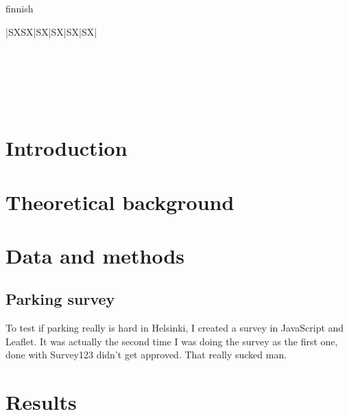 \documentclass[a4paper,11pt]{article}
\newcommand\Tstrut{\rule{0pt}{2.2ex}}       %
\newcommand\Bstrut{\rule[-4.0ex]{0pt}{0pt}} %
\newcommand{\TBstrut}{\Tstrut\Bstrut}       %
\begin{document}
\begin{spacing}{1}
\begin{otherlanguage*}{finnish}
\begin{tabularx}{\linewidth}{|S{X}S{X}|S{X}|S{X}|S{X}|S{X}|}
     \TBstrut\\
    \hline
     \TBstrut\\
    \hline
     \TBstrut\\
    \Xhline{3\arrayrulewidth}
\end{tabularx}
\end{otherlanguage*}
\end{spacing}

\newpage
{}
\thispagestyle{empty}
\renewcommand*\contentsname{Table of contents} %
\tableofcontents

\newpage
\setcounter{page}{1} %
\section{Introduction}

\newpage
\section{Theoretical background}

\newpage
\section{Data and methods}
\subsection{Parking survey}
\justify
To test if parking really is hard in Helsinki, I created a survey in JavaScript and Leaflet. It was actually the second time I was doing the survey as the first one, done with Survey123 didn't get approved. That really sucked man.

\newpage
\section{Results}
\end{document}
